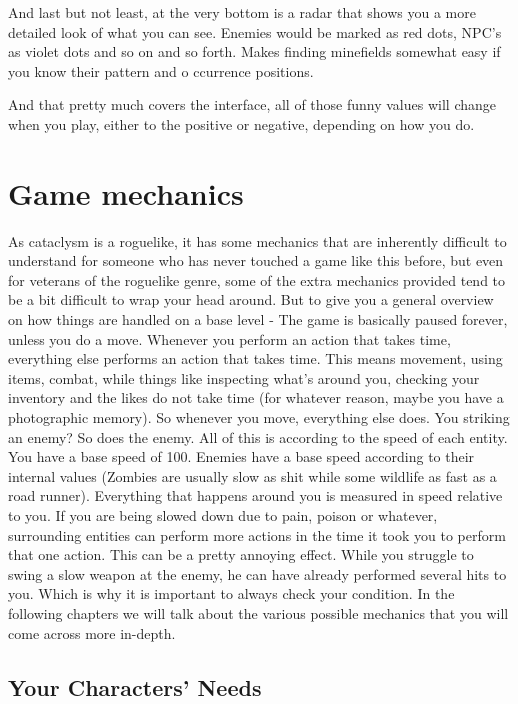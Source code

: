 And last but not least, at the very bottom is a radar that shows you a more detailed look of what you can see. Enemies would be marked as red dots, NPC's as violet dots and so on and so forth. Makes finding minefields somewhat easy if you know their pattern and o
ccurrence positions.

And that pretty much covers the interface, all of those funny values will change when you play, either to the positive or negative, depending on how you do.

\section{Game mechanics}

As cataclysm is a roguelike, it has some mechanics that are inherently difficult to understand for someone who has never touched a game like this before, but even for veterans of the roguelike genre, some of the extra mechanics provided tend to be a bit difficult to wrap your head around. But to give you a general overview on how things are handled on a base level - The game is basically paused forever, unless you do a move. Whenever you perform an action that takes time, everything else performs an action that takes time. This means movement, using items, combat, while things like inspecting what's around you, checking your inventory and the likes do not take time (for whatever reason, maybe you have a photographic memory). So whenever you move, everything else does. You striking an enemy? So does the enemy. All of this is according to the speed of each entity. You have a base speed of 100. Enemies have a base speed according to their internal values (Zombies are usually slow as shit while some wildlife as fast as a road runner). Everything that happens around you is measured in speed relative to you. If you are being slowed down due to pain, poison or whatever, surrounding entities can perform more actions in the time it took you to perform that one action. This can be a pretty annoying effect. While you struggle to swing a slow weapon at the enemy, he can have already performed several hits to you. Which is why it is important to always check your condition. In the following chapters we will talk about the various possible mechanics that you will come across more in-depth.

\subsection{Your Characters' Needs}


